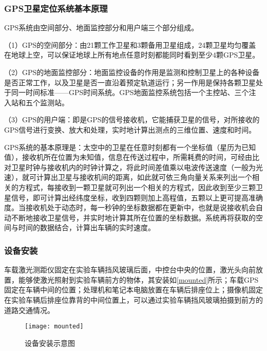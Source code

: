 \subsubsection{GPS卫星定位系统基本原理}
GPS系统由空间部分、地面监控部分和用户端三个部分组成。

（1）GPS的空间部分：由21颗工作卫星和3颗备用卫星组成，24颗卫星均匀覆盖在地球上空，可以保证地球上所有地点任意时刻都能同时看到至少4颗GPS卫星。

（2）GPS的地面监控部分：地面监控设备的作用是监测和控制卫星上的各种设备是否正常工作，以及卫星是否一直沿着预定轨道运行；另一作用是保持各颗卫星处于同一时间标准——GPS时间系统。GPS地面监控系统包括一个主控站、三个注入站和五个监测站。

（3）GPS的用户端：即是GPS的信号接收机，它能捕获卫星的信号，对所接收的GPS信号进行变换、放大和处理，实时地计算出测点的三维位置、速度和时间。

GPS系统的基本原理是：太空中的卫星在任意时刻都有一个坐标值（星历为已知值），接收机所在位置为未知值，信息在传送过程中，所需耗费的时间，可经由比对卫星时钟与接收机内的时钟计算之，将此时间差值乘以电波传送速度（一般为光速），就可计算出卫星与接收机间的距离，如此就可依三角向量关系来列出一个相关的方程式，每接收到一颗卫星就可列出一个相关的方程式，因此收到至少三颗卫星信号，即可计算出经纬度坐标，收到四颗则加上高程值，五颗以上更可提高准确度。当接收机处于动态时，每一秒钟的坐标数据都在更新中，也就是说接收机会自动不断地接收卫星信号，并实时地计算其所在位置的坐标数据。系统再将获取的空间与时间的数据结合，计算出车辆的实时速度。

\subsubsection{设备安装}
车载激光测距仪固定在实验车辆挡风玻璃后面，中控台中央的位置，激光头向前放置，能够使激光照射到实验车辆前方的物体，其安装如\autoref{mounted}所示；车载GPS固定在车辆中间的位置；处理机和笔记本电脑放置在车辆后排座位上；摄像机固定在实验车辆后排座位靠背的中间位置上，可以通过实验车辆挡风玻璃拍摄到前方的道路交通情况。


\begin{figure}[htpb]
	\centering
	\texttt{[image: mounted]}
	\caption{设备安装示意图}
	\label{mounted}
\end{figure}




